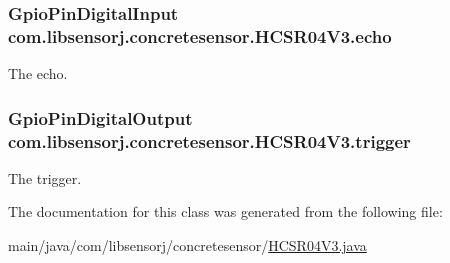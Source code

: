\subsubsection[{echo}]{\setlength{\rightskip}{0pt plus 5cm}Gpio\+Pin\+Digital\+Input com.\+libsensorj.\+concretesensor.\+H\+C\+S\+R04\+V3.\+echo\hspace{0.3cm}{\ttfamily [package]}}\label{classcom_1_1libsensorj_1_1concretesensor_1_1HCSR04V3_af9a0b50a27f87a546ac58b58bb31d904}
The echo. \hypertarget{classcom_1_1libsensorj_1_1concretesensor_1_1HCSR04V3_a19762eb3b140e33fde8b7e2d936a43dc}{}
\subsubsection[{trigger}]{\setlength{\rightskip}{0pt plus 5cm}Gpio\+Pin\+Digital\+Output com.\+libsensorj.\+concretesensor.\+H\+C\+S\+R04\+V3.\+trigger\hspace{0.3cm}{\ttfamily [package]}}\label{classcom_1_1libsensorj_1_1concretesensor_1_1HCSR04V3_a19762eb3b140e33fde8b7e2d936a43dc}
The trigger. 

The documentation for this class was generated from the following file\+:\begin{DoxyCompactItemize}
\item 
main/java/com/libsensorj/concretesensor/\hyperlink{HCSR04V3_8java}{H\+C\+S\+R04\+V3.\+java}\end{DoxyCompactItemize}
